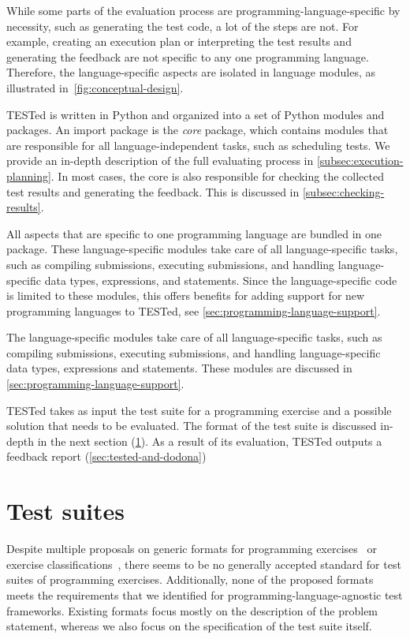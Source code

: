 \documentclass[../main]{subfiles}
\begin{document}
While some parts of the evaluation process are programming-language-specific by necessity, such as generating the test code, a lot of the steps are not.
For example, creating an execution plan or interpreting the test results and generating the feedback are not specific to any one programming language.
Therefore, the language-specific aspects are isolated in language modules, as illustrated in~\cref{fig:conceptual-design}.

\leavevmode{}%
TESTed is written in Python and organized into a set of Python modules and packages.
An import package is the \emph{core} package, which contains modules that are responsible for all language-independent tasks, such as scheduling tests.
We provide an in-depth description of the full evaluating process in \cref{subsec:execution-planning}.
In most cases, the core is also responsible for checking the collected test results and generating the feedback.
This is discussed in \cref{subsec:checking-results}.

All aspects that are specific to one programming language are bundled in one package.
These language-specific modules take care of all language-specific tasks, such as compiling submissions, executing submissions, and handling language-specific data types, expressions, and statements.
Since the language-specific code is limited to these modules, this offers benefits for adding support for new programming languages to TESTed, see \cref{sec:programming-language-support}.

The language-specific modules take care of all language-specific tasks, such as compiling submissions, executing submissions, and handling language-specific data types, expressions and statements.
These modules are discussed in \cref{sec:programming-language-support}.

TESTed takes as input the test suite for a programming exercise and a possible solution that needs to be evaluated.
The format of the test suite is discussed in-depth in the next section (\cref{sec:test-suites}).
As a result of its evaluation, TESTed outputs a feedback report (\cref{sec:tested-and-dodona})

\section{Test suites}\label{sec:test-suites}

Despite multiple proposals on generic formats for programming exercises~\autocite{edwardsDevelopingCommonFormat2008a,paivaAnotherProgrammingExercises2020,queirosPexilProgrammingExercises2011,verhoeffProgrammingTaskPackages2008} or exercise classifications~\autocite{leOperationalizingContinuumWellDefined2013,simoesNatureProgrammingExercises2020}, there seems to be no generally accepted standard for test suites of programming exercises.
Additionally, none of the proposed formats meets the requirements that we identified for programming-language-agnostic test frameworks.
Existing formats focus mostly on the description of the problem statement, whereas we also focus on the specification of the test suite itself.
\end{document}
